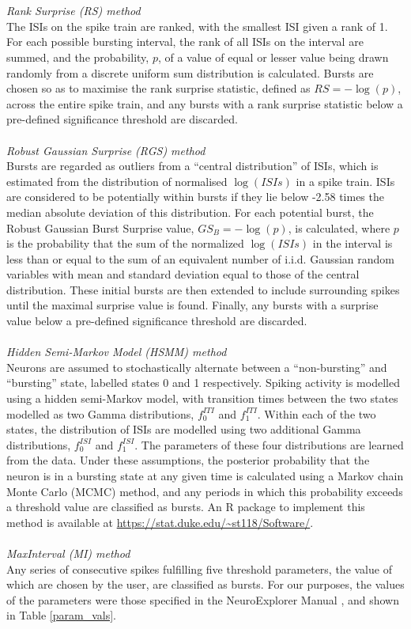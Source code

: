 \documentclass[12pt, titlepage]{article}
\begin{document}
	\\ \\ \textit{Rank Surprise (RS) method \cite{Gourevitch2007}}
	\\The ISIs on the spike train are ranked,  with the smallest ISI given a rank of 1. For each possible bursting interval, the rank of all ISIs on the interval are summed, and the probability, $p$, of a value of equal or lesser value  being drawn randomly from a discrete uniform sum distribution is calculated. Bursts are chosen so as to maximise the rank surprise statistic, defined as $RS=-\log(p)$, across the entire spike train, and any bursts with a rank surprise statistic below a pre-defined significance threshold are discarded\nocite{Gourevitch2007}. 
	\\ \\ \textit{Robust Gaussian Surprise (RGS) method \cite{Ko2012}}
	\\Bursts are regarded as outliers from a ``central distribution'' of ISIs, which is estimated from the distribution of normalised $\log(ISIs)$ in a spike train. ISIs are considered to be potentially within bursts if they lie below -2.58 times the median absolute deviation of this distribution. For each potential burst, the Robust Gaussian Burst Surprise value, $GS_B=-\log(p)$, is calculated, where $p$ is the probability that the sum of the normalized $\log(ISIs)$ in the interval is less than or equal to the sum of an equivalent number of i.i.d. Gaussian random variables with mean and standard deviation equal to those of the central distribution. These initial bursts are then extended to include surrounding spikes until the maximal surprise value is found. Finally, any bursts with a surprise value below a pre-defined significance threshold are discarded.
	\\ \\ \textit{Hidden Semi-Markov Model (HSMM) method \cite{Tokdar2010}}
	\\Neurons are assumed to stochastically alternate between a ``non-bursting'' and ``bursting'' state, labelled states 0 and 1 respectively. Spiking activity is modelled using a hidden semi-Markov model, with transition times between the two states modelled as two Gamma distributions,  $f_0^{ITI}$ and $f_1^{ITI}$.  Within each of the two states, the distribution of ISIs are modelled using two additional Gamma distributions, $f_0^{ISI}$ and $f_1^{ISI}$. The parameters of these four distributions are learned from the data. Under these assumptions, the posterior probability that the neuron is in a bursting state at any given time is calculated using a Markov chain Monte Carlo (MCMC) method, and any periods in which this probability exceeds a threshold value are classified as bursts. An R package to implement this method is available at \url{https://stat.duke.edu/~st118/Software/}.
	\\ \\ \textit{MaxInterval (MI) method  \cite{NEmanual}}
	\\Any series of consecutive spikes fulfilling five threshold parameters, the value of which are chosen by the user, are classified as bursts. For our purposes, the values of the parameters were those specified in the NeuroExplorer Manual \cite{NEmanual}, and shown in Table \ref{param_vals}.
\end{document}
